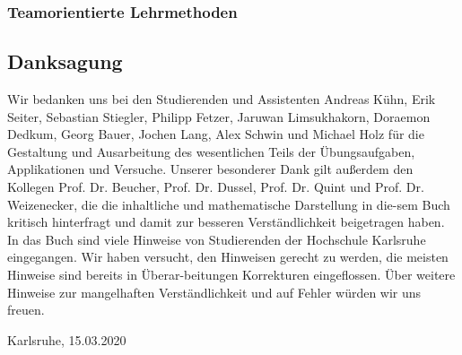\subsubsection{Teamorientierte Lehrmethoden}
\clearpage
\subsection{Danksagung}

Wir bedanken uns bei den Studierenden und Assistenten Andreas Kühn, Erik Seiter, Sebastian Stiegler, Philipp Fetzer, Jaruwan Limsukhakorn, Doraemon Dedkum, Georg Bauer, Jochen Lang, Alex Schwin und Michael Holz für die Gestaltung und Ausarbeitung des wesentlichen Teils der Übungsaufgaben, Applikationen und Versuche.\newline
Unserer besonderer Dank gilt außerdem den Kollegen Prof. Dr. Beucher, Prof. Dr. Dussel, Prof. Dr. Quint und Prof. Dr. Weizenecker, die die inhaltliche und mathematische Darstellung in die-sem Buch kritisch hinterfragt und damit zur besseren Verständlichkeit beigetragen haben. \newline
In das Buch sind viele Hinweise von Studierenden der Hochschule Karlsruhe eingegangen. Wir haben versucht, den Hinweisen gerecht zu werden, die meisten Hinweise sind bereits in Überar-beitungen Korrekturen eingeflossen. Über weitere Hinweise zur mangelhaften Verständlichkeit und auf Fehler würden wir uns freuen. \newline

\noindent Karlsruhe, 15.03.2020

